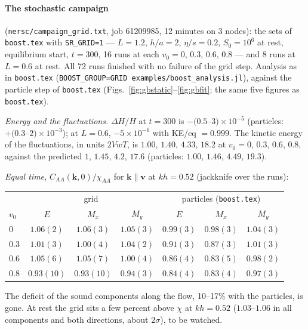 \documentclass[11pt,aps,preprint,nofootinbib,superscriptaddress,tightenlines]{revtex4-2}
\let\oldparagraph\paragraph
\renewcommand{\paragraph}{\par\bigskip\oldparagraph}
\begin{document}
\paragraph{The stochastic campaign} (\texttt{nersc/campaign\_grid.txt}, job 61209985, 12 minutes on 3 nodes):
the sets of \texttt{boost.tex} with \texttt{SR\_GRID=1} --- $L=1.2$, $h/a=2$, $\eta/s=0.2$, $S_0=10^6$ at rest,
equilibrium start, $t=300$, 16 runs at each $v_0=0$, $0.3$, $0.6$, $0.8$ --- and 8 runs at $L=0.6$ at rest.
All 72 runs finished with no failure of the grid step.  Analysis as in \texttt{boost.tex}
(\texttt{BOOST\_GROUP=GRID examples/boost\_analysis.jl}), against the particle step of \texttt{boost.tex}
(Figs.~\ref{fig:gbstatic}--\ref{fig:gbfit}; the same five figures as \texttt{boost.tex}).

\emph{Energy and the fluctuations.}  $\Delta H/H$ at $t=300$ is $-(0.5$--$3)\times10^{-5}$ (particles:
$+(0.3$--$2)\times10^{-3}$); at $L=0.6$, $-5\times10^{-6}$ with KE/eq $=0.999$.  The kinetic energy of the
fluctuations, in units $2VwT$, is $1.00$, $1.40$, $4.33$, $18.2$ at $v_0=0$, $0.3$, $0.6$, $0.8$, against the
predicted $1$, $1.45$, $4.2$, $17.6$ (particles: $1.00$, $1.46$, $4.49$, $19.3$).

\emph{Equal time,} $C_{AA}(\bm k,0)/\chi_{AA}$ for $\bm k\parallel\bm v$ at $kh=0.52$ (jackknife over the runs):
\begin{center}
\begin{tabular}{lcccccc}
\hline
 & \multicolumn{3}{c}{grid} & \multicolumn{3}{c}{particles (\texttt{boost.tex})} \\
$v_0$ & $E$ & $M_x$ & $M_y$ & $E$ & $M_x$ & $M_y$ \\ \hline
0 & $1.06(2)$ & $1.06(3)$ & $1.05(3)$ & $0.99(3)$ & $0.98(3)$ & $1.04(3)$ \\
0.3 & $1.01(3)$ & $1.00(4)$ & $1.04(2)$ & $0.91(3)$ & $0.87(3)$ & $1.01(3)$ \\
0.6 & $1.05(6)$ & $1.05(7)$ & $1.00(4)$ & $0.86(4)$ & $0.83(5)$ & $0.98(2)$ \\
0.8 & $0.93(10)$ & $0.93(10)$ & $0.94(3)$ & $0.84(4)$ & $0.83(4)$ & $0.97(3)$ \\
\hline
\end{tabular}
\end{center}
The deficit of the sound components along the flow, 10--17\% with the particles, is gone.  At rest the
grid sits a few percent above $\chi$ at $kh=0.52$ ($1.03$--$1.06$ in all components and both directions,
about $2\sigma$), to be watched.
\end{document}
